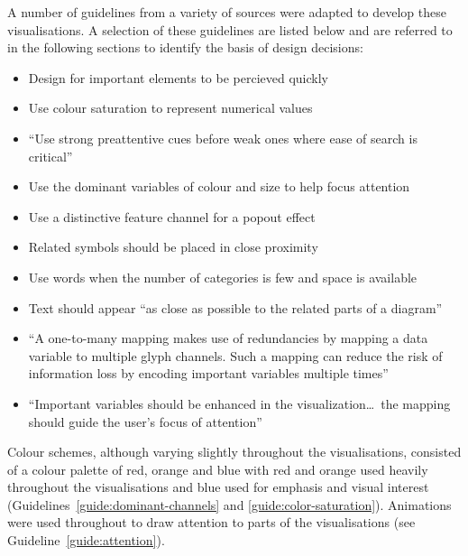 A number of guidelines from a variety of sources were adapted to develop these visualisations. A selection of these guidelines are listed below and are referred to in the following sections to identify the basis of design decisions:
\begin{itemize}
\item Design for important elements to be percieved quickly \cite[p.~14]{Ware2013a}~
\item Use colour saturation to represent numerical values \cite[p.~117]{Ware2013a}~
\item ``Use strong preattentive cues before weak ones where ease of search is critical'' \cite[p.~156]{Ware2013a}~
\item Use the dominant variables of colour and size to help focus attention \cite[p.~45]{Borgo2013}~
\item Use a distinctive feature channel for a popout effect \cite[p.~157]{Ware2013a}~
\item Related symbols should be placed in close proximity \cite[p.~181]{Ware2013a}~
\item Use words when the number of categories is few and space is available \cite[p.~321]{Ware2013a}~
\item Text should appear ``as close as possible to the related parts of a diagram'' \cite[p.~333]{Ware2013a}~
\item ``A one-to-many mapping makes use of redundancies by mapping a data variable to multiple glyph channels. Such a mapping can reduce the risk of information loss by encoding important variables multiple times'' \cite[p.~52]{Borgo2013}~
\item ``Important variables should be enhanced in the visualization\ldots~the mapping should guide the user's focus of attention'' \cite[p.~52]{Borgo2013}~
\end{itemize}

Colour schemes, although varying slightly throughout the visualisations, consisted of a colour palette of red, orange and blue with red and orange used heavily throughout the visualisations and blue used for emphasis and visual interest (Guidelines~\ref{guide:dominant-channels} and \ref{guide:color-saturation}). Animations were used throughout to draw attention to parts of the visualisations (see Guideline~\ref{guide:attention}).

